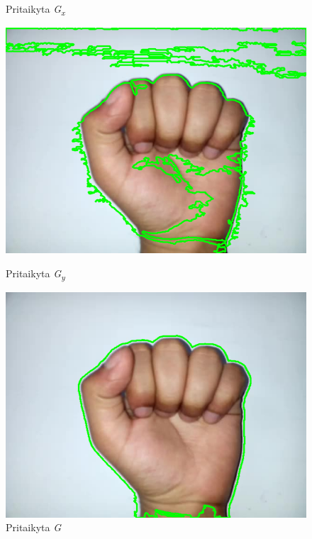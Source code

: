 \documentclass{VUMIFInfKursinis}
\begin{document}
\begin{figure}[H]
\begin{minipage}{.3\textwidth}
		\caption{Pritaikyta \textit{G\textsubscript{x}}}
		\label{img:a-sobelX}
	\end{minipage}\hspace{\fill}%
	\begin{minipage}{.3\textwidth}
		\centering
		\includegraphics[width=.8\linewidth]{img/A-sobelY}
		\caption{Pritaikyta \textit{G\textsubscript{y}}}
		\label{img:a-sobelY}
	\end{minipage}\hspace{\fill}%
	\begin{minipage}{.3\textwidth}
		\centering
		\includegraphics[width=.8\linewidth]{img/A-sobel}
		\caption{Pritaikyta \textit{G}}
		\label{img:a-sobel}
	\end{minipage}\hspace{\fill}%

\end{figure}
\end{document}
